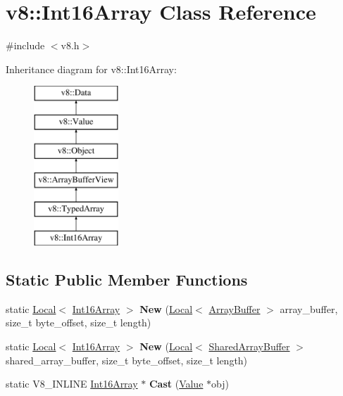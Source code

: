 \hypertarget{classv8_1_1_int16_array}{}\section{v8\+:\+:Int16\+Array Class Reference}
\label{classv8_1_1_int16_array}


{\ttfamily \#include $<$v8.\+h$>$}

Inheritance diagram for v8\+:\+:Int16\+Array\+:\begin{figure}[H]
\begin{center}
\leavevmode
\includegraphics[height=6.000000cm]{classv8_1_1_int16_array}
\end{center}
\end{figure}
\subsection*{Static Public Member Functions}
\begin{DoxyCompactItemize}
\item 
static \hyperlink{classv8_1_1_local}{Local}$<$ \hyperlink{classv8_1_1_int16_array}{Int16\+Array} $>$ {\bfseries New} (\hyperlink{classv8_1_1_local}{Local}$<$ \hyperlink{classv8_1_1_array_buffer}{Array\+Buffer} $>$ array\+\_\+buffer, size\+\_\+t byte\+\_\+offset, size\+\_\+t length)\hypertarget{classv8_1_1_int16_array_a6e102d644c3f96345bcf212673b96090}{}\label{classv8_1_1_int16_array_a6e102d644c3f96345bcf212673b96090}

\item 
static \hyperlink{classv8_1_1_local}{Local}$<$ \hyperlink{classv8_1_1_int16_array}{Int16\+Array} $>$ {\bfseries New} (\hyperlink{classv8_1_1_local}{Local}$<$ \hyperlink{classv8_1_1_shared_array_buffer}{Shared\+Array\+Buffer} $>$ shared\+\_\+array\+\_\+buffer, size\+\_\+t byte\+\_\+offset, size\+\_\+t length)\hypertarget{classv8_1_1_int16_array_a9634021f52042c976091549358731432}{}\label{classv8_1_1_int16_array_a9634021f52042c976091549358731432}

\item 
static V8\+\_\+\+I\+N\+L\+I\+NE \hyperlink{classv8_1_1_int16_array}{Int16\+Array} $\ast$ {\bfseries Cast} (\hyperlink{classv8_1_1_value}{Value} $\ast$obj)\hypertarget{classv8_1_1_int16_array_abef12f11ace9c74a4ce451db28b954e5}{}\label{classv8_1_1_int16_array_abef12f11ace9c74a4ce451db28b954e5}

\end{DoxyCompactItemize}
